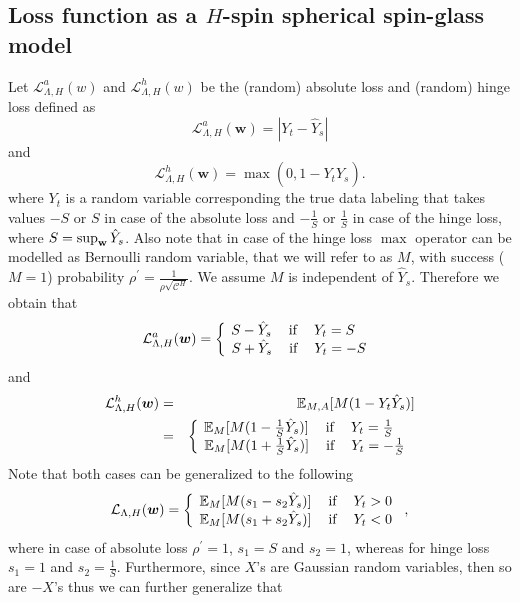 \documentclass[twoside]{article}
\begin{document}
\subsection{Loss function as a $H$-spin spherical spin-glass model}
\label{subsec:LFSG}

Let $\mathcal{L}^a_{\Lambda,H}(w)$ and $\mathcal{L}^h_{\Lambda,H}(w)$ be the (random) absolute loss and (random) hinge loss defined as
\[\mathcal{L}^a_{\Lambda,H}({\bm w}) = |Y_t - \hat{Y}_s|
\]
and
\[\mathcal{L}^h_{\Lambda,H}({\bm w}) = \max(0,1-Y_t\hat{Y}_s).
\]
where $Y_t$ is a random variable corresponding the true data labeling that takes values $-S$ or $S$ in case of the absolute loss and $-\frac{1}{S}$ or $\frac{1}{S}$ in case of the hinge loss, where $S = \sup_{\bf{w}}{\hat{Y}_s}$. Also note that in case of the hinge loss $\max$ operator can be modelled as Bernoulli random variable, that we will refer to as $M$, with success ($M = 1$) probability $\rho^{'} = \frac{1}{\rho\sqrt{\mathcal{C}^H}}$. We assume $M$ is independent of $\hat{Y}_s$. Therefore we obtain that
\[\mathcal{L}^a_{\Lambda,H}({\bm w}) = \left \{
  \begin{tabular}{c}
  $\!\!\!\!\!\!S - \hat{Y}_s$ $\:\:\:\:$if$\:\:\:\:$ $Y_t = S$ \\
  $\!S + \hat{Y}_s$ $\:\:\:\:$if$\:\:\:\:$ $Y_t = -S$ \\
  \end{tabular}
\right.
\]
and
\begin{eqnarray*}
\mathcal{L}^h_{\Lambda,H}({\bm w}) &=& \mathbb{E}_{M,A}[M(
1-Y_t\hat{Y}_s)]\\&=& \left \{
  \begin{tabular}{c}
  $\!\!\!\!\!\!\mathbb{E}_{M}[M(1 - \frac{1}{S}\hat{Y}_s)]$ $\:\:\:\:$if$\:\:\:\:$ $Y_t = \frac{1}{S}$ \\
  $\!\mathbb{E}_{M}[M(1 + \frac{1}{S}\hat{Y}_s)]$ $\:\:\:\:$if$\:\:\:\:$ $Y_t = -\frac{1}{S}$ \\
  \end{tabular}
\right.
\end{eqnarray*}
Note that both cases can be generalized to the following
\[\mathcal{L}_{\Lambda,H}({\bm w}) = \left \{
  \begin{tabular}{c}
  $\!\mathbb{E}_{M}[M(s_1 - s_2\hat{Y}_s)]$ $\:\:\:\:$if$\:\:\:\:$ $Y_t  > 0$ \\
  $\!\mathbb{E}_{M}[M(s_1 + s_2\hat{Y}_s)]$ $\:\:\:\:$if$\:\:\:\:$ $Y_t < 0$ \\
  \end{tabular}
\right.,
\]
where in case of absolute loss $\rho^{'} = 1$, $s_1 = S$ and $s_2 = 1$, whereas for hinge loss $s_1 = 1$ and $s_2 = \frac{1}{S}$. Furthermore, since $X$'s are Gaussian random variables, then so are $-X$'s thus we can further generalize that
\end{document}
